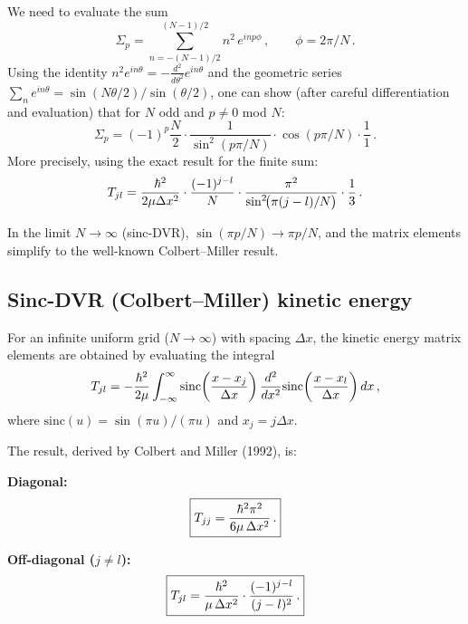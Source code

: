 We need to evaluate the sum
\begin{equation}
  \Sigma_p = \sum_{n=-(N-1)/2}^{(N-1)/2} n^2\,e^{i n p\phi}\,,\qquad \phi = 2\pi/N\,.
\end{equation}
Using the identity $n^2 e^{in\theta} = -\frac{d^2}{d\theta^2}e^{in\theta}$ and the geometric
series $\sum_n e^{in\theta} = \sin(N\theta/2)/\sin(\theta/2)$, one can show (after careful
differentiation and evaluation) that for $N$ odd and $p \neq 0$ mod $N$:
\begin{equation}
  \Sigma_p = (-1)^p\frac{N}{2}\cdot\frac{1}{\sin^2(p\pi/N)}\cdot\cos(p\pi/N)\cdot\frac{1}{1}\,.
\end{equation}
More precisely, using the exact result for the finite sum:
\begin{equation}
  T_{jl} = \frac{\hbar^2}{2\mu\Delta x^2}\cdot\frac{(-1)^{j-l}}{N}\cdot\frac{\pi^2}{\sin^2\!\bigl(\pi(j-l)/N\bigr)}\cdot\frac{1}{3}\,.
\end{equation}

In the limit $N \to \infty$ (sinc-DVR), $\sin(\pi p/N) \to \pi p/N$, and the matrix elements
simplify to the well-known Colbert--Miller result.

\subsection{Sinc-DVR (Colbert--Miller) kinetic energy}\label{sec:sinc_DVR}

For an infinite uniform grid ($N \to \infty$) with spacing $\Delta x$, the kinetic energy
matrix elements are obtained by evaluating the integral
\begin{equation}
  T_{jl} = -\frac{\hbar^2}{2\mu}\int_{-\infty}^{\infty}\text{sinc}\!\left(\frac{x-x_j}{\Delta x}\right)\frac{d^2}{dx^2}\text{sinc}\!\left(\frac{x-x_l}{\Delta x}\right)dx\,,
\end{equation}
where $\text{sinc}(u) = \sin(\pi u)/(\pi u)$ and $x_j = j\Delta x$.

The result, derived by Colbert and Miller (1992), is:

\textbf{Diagonal:}
\begin{equation}\label{eq:T_DVR_diag}
  \boxed{T_{jj} = \frac{\hbar^2\pi^2}{6\mu\,\Delta x^2}\,.}
\end{equation}

\textbf{Off-diagonal ($j \neq l$):}
\begin{equation}\label{eq:T_DVR_offdiag}
  \boxed{T_{jl} = \frac{\hbar^2}{\mu\,\Delta x^2}\cdot\frac{(-1)^{j-l}}{(j-l)^2}\,.}
\end{equation}

